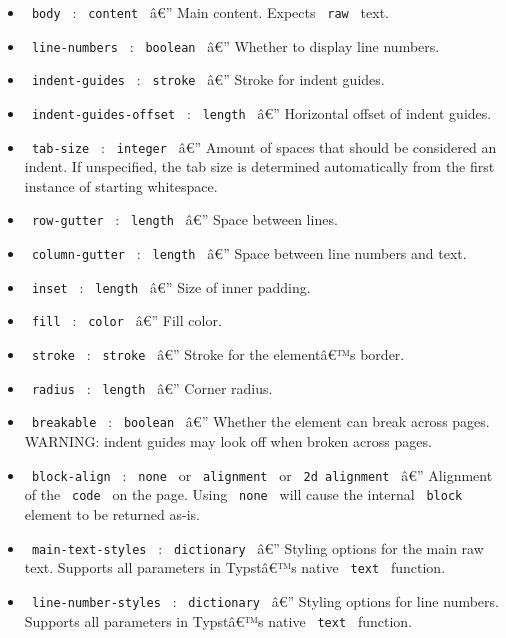 \begin{itemize}
\item
  \texttt{\ body\ } : \texttt{\ content\ } â€'' Main content. Expects
  \texttt{\ raw\ } text.
\item
  \texttt{\ line-numbers\ } : \texttt{\ boolean\ } â€'' Whether to
  display line numbers.
\item
  \texttt{\ indent-guides\ } : \texttt{\ stroke\ } â€'' Stroke for
  indent guides.
\item
  \texttt{\ indent-guides-offset\ } : \texttt{\ length\ } â€''
  Horizontal offset of indent guides.
\item
  \texttt{\ tab-size\ } : \texttt{\ integer\ } â€'' Amount of spaces
  that should be considered an indent. If unspecified, the tab size is
  determined automatically from the first instance of starting
  whitespace.
\item
  \texttt{\ row-gutter\ } : \texttt{\ length\ } â€'' Space between
  lines.
\item
  \texttt{\ column-gutter\ } : \texttt{\ length\ } â€'' Space between
  line numbers and text.
\item
  \texttt{\ inset\ } : \texttt{\ length\ } â€'' Size of inner padding.
\item
  \texttt{\ fill\ } : \texttt{\ color\ } â€'' Fill color.
\item
  \texttt{\ stroke\ } : \texttt{\ stroke\ } â€'' Stroke for the
  elementâ€™s border.
\item
  \texttt{\ radius\ } : \texttt{\ length\ } â€'' Corner radius.
\item
  \texttt{\ breakable\ } : \texttt{\ boolean\ } â€'' Whether the element
  can break across pages. WARNING: indent guides may look off when
  broken across pages.
\item
  \texttt{\ block-align\ } : \texttt{\ none\ } or \texttt{\ alignment\ }
  or \texttt{\ 2d\ alignment\ } â€'' Alignment of the \texttt{\ code\ }
  on the page. Using \texttt{\ none\ } will cause the internal
  \texttt{\ block\ } element to be returned as-is.
\item
  \texttt{\ main-text-styles\ } : \texttt{\ dictionary\ } â€'' Styling
  options for the main raw text. Supports all parameters in Typstâ€™s
  native \texttt{\ text\ } function.
\item
  \texttt{\ line-number-styles\ } : \texttt{\ dictionary\ } â€'' Styling
  options for line numbers. Supports all parameters in Typstâ€™s native
  \texttt{\ text\ } function.
\end{itemize}

